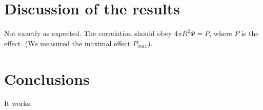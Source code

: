 \documentclass[a4paper]{article}
\begin{document}
\section{Discussion of the results}

Not exactly as expected. The correlation should obey $4\pi R^2\Phi = P$, where $P$ is the effect. (We measured the maximal effect $P_{max}$).

\section{Conclusions}

It works.
\end{document}
